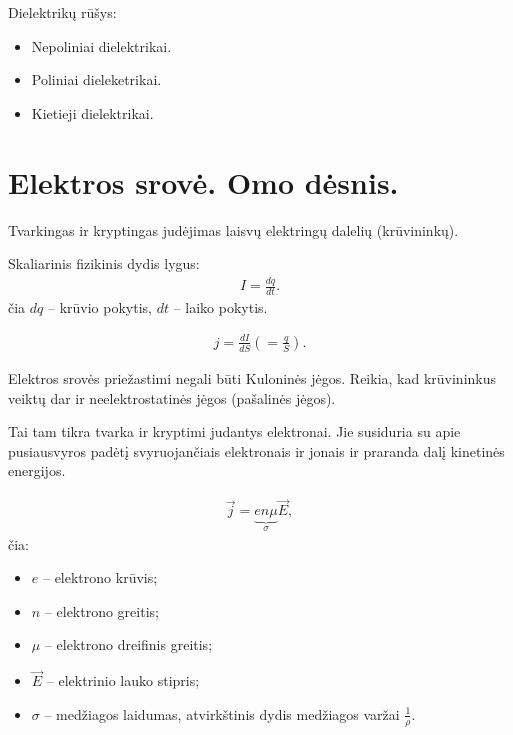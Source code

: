 Dielektrikų rūšys:
\begin{itemize}
  \item Nepoliniai dielektrikai.
  \item Poliniai dieleketrikai.
  \item Kietieji dielektrikai.
\end{itemize}

\chapter{Elektros srovė. Omo dėsnis.}

\begin{defn}
  Tvarkingas ir kryptingas judėjimas laisvų elektringų dalelių 
  (krūvininkų).
\end{defn}

\begin{defn}
  Skaliarinis fizikinis dydis lygus:
  \begin{align*}
    I = \frac{dq}{dt}.
  \end{align*}
  čia $dq$ – krūvio pokytis, $dt$ – laiko pokytis.
\end{defn}

\begin{defn}
  \begin{align*}
    j = \frac{dI}{dS} \left( = \frac{q}{S} \right).
  \end{align*}
\end{defn}

Elektros srovės priežastimi negali būti Kuloninės jėgos. Reikia, kad
krūvininkus veiktų dar ir neelektrostatinės jėgos (pašalinės jėgos).

\begin{defn}
  Tai tam tikra tvarka ir kryptimi judantys elektronai. Jie susiduria su
  apie pusiausvyros padėtį svyruojančiais elektronais ir jonais ir
  praranda dalį kinetinės energijos.
\end{defn}

\begin{defn}
  \begin{align*}
    \vec{j} = \underbrace{en\mu}_{\sigma}\vec{E},
  \end{align*}
  čia:
  \begin{itemize}
    \item $e$ – elektrono krūvis;
    \item $n$ – elektrono greitis;
    \item $\mu$ – elektrono dreifinis greitis;
    \item $\vec{E}$ – elektrinio lauko stipris;
    \item $\sigma$ – medžiagos laidumas, atvirkštinis dydis
      medžiagos varžai $\frac{1}{\rho}$.
  \end{itemize}
\end{defn}

